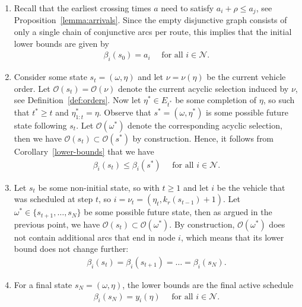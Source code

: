 \documentclass{report}
\theoremstyle{definition}
\theoremstyle{plain}
\begin{document}
\begin{enumerate}[label=(\roman*)\;\;,leftmargin=3.5em,midpenalty=5]
  \item Recall that the earliest crossing times $a$ need to satisfy $a_i + \rho \leq a_j$,
        see Proposition~\ref{lemma:arrivals}. Since the empty disjunctive graph consists of only
        a single chain of conjunctive arcs per route, this implies that the
        initial lower bounds are given by
        \begin{align}
          \beta_i(s_0) = a_i \quad \text{ for all } i \in \mathcal{N}.
        \end{align}

  \item Consider some state $s_t = (\omega, \eta)$ and let $\nu = \nu(\eta)$ be the
        current vehicle order. Let $\mathcal{O}(s_t) = \mathcal{O}(\nu)$ denote
        the current acyclic selection induced by $\nu$, see
        Definition~\ref{def:orders}.
        Now let $\eta^* \in E_{t^*}$ be some completion of $\eta$, so such that
        $t^* \geq t$ and $\eta^*_{1:t} = \eta$.
        Observe that $s^* = (\omega, \eta^*)$ is some possible future state following
        $s_t$. Let $\mathcal{O}(\omega^*)$ denote the corresponding acyclic
        selection, then we have $\mathcal{O}(s_t) \subset \mathcal{O}(s^*)$ by
        construction. Hence, it follows from Corollary~\ref{lower-bounds} that
        we have
        \begin{align}
          \beta_i(s_t) \leq \beta_i(s^*) \quad \text{ for all } i \in \mathcal{N} .
        \end{align}

  \item Let $s_t$ be some non-initial state, so with $t \geq 1$ and let $i$ be
        the vehicle that was scheduled at step $t$, so
        $i = \nu_t =  (\eta_t, k_r(s_{t-1}) + 1)$.
        Let $\omega^* \in \{s_{t+1}, \dots, s_N\}$ be some possible future state,
        then as argued in the previous point, we have
        $\mathcal{O}(s_t) \subset \mathcal{O}(\omega^*)$.
        By construction, $\mathcal{O}(\omega^*)$ does not contain additional arcs
        that end in node $i$, which means that its lower bound does not change
        further:
        \begin{align}
          \beta_i(s_t) = \beta_{i}(s_{t+1}) = \dots = \beta_i(s_N) .
        \end{align}

  \item For a final state $s_N = (\omega, \eta)$, the lower bounds are the final
        active schedule
        \begin{align*}
          \beta_i(s_N) = y_i(\eta) \quad \text{ for all } i \in \mathcal{N}.
        \end{align*}

\end{enumerate}
\end{document}
